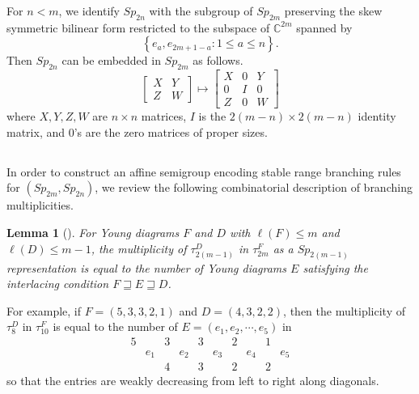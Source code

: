\documentclass[11pt]{amsart}
\numberwithin{equation}{subsection}
\newtheorem{lemma}[theorem]{Lemma}
\begin{document}
For $n<m$, we identify ${Sp}_{2n}$ with the subgroup of ${Sp}_{2m}$
preserving the skew symmetric bilinear form restricted to the subspace of 
$\mathbb{C}^{2m}$ spanned by $$\left\{ e_{a},e_{2m+1-a}:1\leq a\leq n \right\}.$$ 
Then ${Sp}_{2n}$ can be embedded in ${Sp}_{2m}$ as follows.
\begin{equation} \label{Sp embedding}
\left[ 
\begin{array}{cc}
X & Y \\ 
Z & W\end{array}\right] \mapsto \left[ 
\begin{array}{ccc}
X & 0 & Y \\ 
0 & I & 0 \\ 
Z & 0 & W\end{array}\right] 
\end{equation}
where $X,Y,Z,W$ are $n \times n$ matrices, $I$ is the $2(m-n) \times 2(m-n)$
identity matrix, and $0$'s are the zero matrices of proper sizes.


\subsection{}

In order to construct an affine semigroup encoding stable range branching rules for
$({Sp}_{2m},{Sp}_{2n})$, we review the following combinatorial description of 
branching multiplicities.

\begin{lemma}[{\protect\cite[Theorem 8.1.5]{GW09}}] \label{Sp_branching}
For Young diagrams $F$ and $D$ with $\ell (F)\leq m$ and 
$\ell (D)\leq m-1$, the multiplicity of $\tau _{2(m-1)}^{D}$ in $\tau
_{2m}^{F}$ as a ${Sp}_{2(m-1)}$ representation is equal to the number of
Young diagrams $E$ satisfying the interlacing condition $F\sqsupseteq
E\sqsupseteq D$.
\end{lemma}

For example, if $F=(5,3, 3, 2, 1)$ and $D=(4,3,2,2)$, then the multiplicity of 
$\tau_{8}^{D}$ in $\tau_{10}^{F}$ is equal to the number of 
$E=(e_1, e_2, \cdots, e_5)$ in 
\begin{equation*}
\begin{array}{cccccccccc}
5 &  & 3 &  & 3 &  & 2 &  & 1 &  \\ 
   & e_{1} &  & e_{2} &  & e_{3} &  & e_{4} &  & e_{5} \\ 
&  & 4 &  & 3 &  & 2 &  & 2 &  \end{array}\end{equation*}
so that the entries are weakly decreasing from left to right along diagonals.
\end{document}
